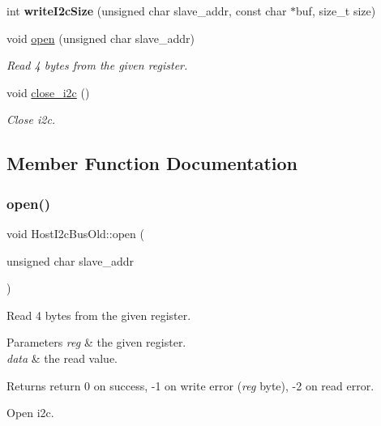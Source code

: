 \begin{DoxyCompactItemize}
\mbox{\label{classHostI2cBusOld_a27695e023af31a1e5f13296c98598ce3}} 
int {\bfseries write\+I2c\+Size} (unsigned char slave\+\_\+addr, const char $\ast$buf, size\+\_\+t size)
\item 
void \hyperlink{classHostI2cBusOld_adffe1c1419af5c47cc58f802ea3426ae}{open} (unsigned char slave\+\_\+addr)
\begin{DoxyCompactList}\small\item\em Read 4 bytes from the given register. \end{DoxyCompactList}\item 
\mbox{\label{classHostI2cBusOld_a297fae73b69dea7f896b954aea951af2}} 
void \hyperlink{classHostI2cBusOld_a297fae73b69dea7f896b954aea951af2}{close\+\_\+i2c} ()
\begin{DoxyCompactList}\small\item\em Close i2c. \end{DoxyCompactList}\end{DoxyCompactItemize}


\subsection{Member Function Documentation}
\mbox{\label{classHostI2cBusOld_adffe1c1419af5c47cc58f802ea3426ae}} 
\subsubsection{\texorpdfstring{open()}{open()}}
{\footnotesize\ttfamily void Host\+I2c\+Bus\+Old\+::open (\begin{DoxyParamCaption}\item[{unsigned char}]{slave\+\_\+addr }\end{DoxyParamCaption})}



Read 4 bytes from the given register. 


\begin{DoxyParams}{Parameters}
{\em reg} & the given register. \\
\hline
{\em data} & the read value.\\
\hline
\end{DoxyParams}
\begin{DoxyReturn}{Returns}
return 0 on success, -\/1 on write error ({\itshape reg} byte), -\/2 on read error.
\end{DoxyReturn}
Open i2c. \mbox{\label{classHostI2cBusOld_a9f680c445abf285e804f9a259d1ad777}} 
